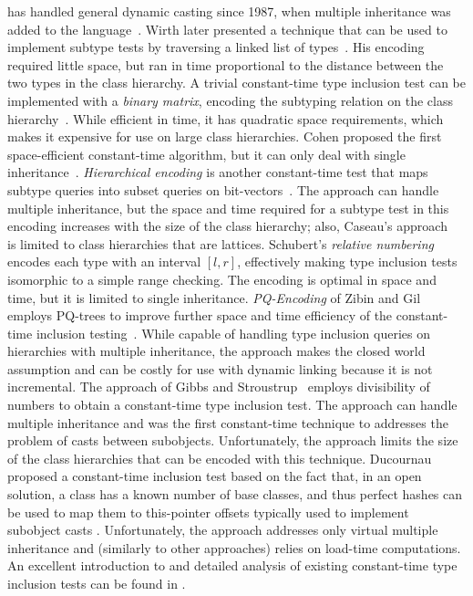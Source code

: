 \Cpp{} has handled general dynamic casting since 1987, when multiple inheritance 
was added to the language~\cite{Str87}. Wirth later presented a technique that 
can be used to implement subtype tests by traversing a linked list of 
types~\cite{Wirth88}. His encoding required little space, but ran in time 
proportional to the distance between the two types in the class hierarchy. 
A trivial constant-time type inclusion test can be implemented with a 
\emph{binary matrix}, encoding the subtyping relation on the class 
hierarchy~\cite{Vortex96}. While efficient in time, it has quadratic space 
requirements, which makes it expensive for use on large class hierarchies. Cohen 
proposed the first space-efficient constant-time algorithm, but it can
only deal with single inheritance~\cite{Cohen91}. \emph{Hierarchical encoding} 
is another constant-time test that maps subtype queries into subset queries on 
bit-vectors~\cite{Caseau93,Krall97nearoptimal}. The approach can handle multiple
inheritance, but the space and time required for a subtype test in this encoding 
increases with the size of the class hierarchy; also, Caseau's approach~\cite{Caseau93} is 
limited to class hierarchies that are lattices. Schubert's \emph{relative 
numbering}~\cite{Schubert83} encodes each type with an interval $[l,r]$, 
effectively making type inclusion tests isomorphic to a simple range checking. 
The encoding is optimal in space and time, but it is limited to single 
inheritance. \emph{PQ-Encoding} of Zibin and Gil employs PQ-trees to improve 
further space and time efficiency of the constant-time inclusion 
testing~\cite{PQEncoding}. While capable of handling type inclusion queries on 
hierarchies with multiple inheritance, the approach makes the closed world assumption and can be costly 
for use with dynamic linking because it is not incremental.
The approach of Gibbs and Stroustrup~\cite{FastDynCast} employs divisibility of 
numbers to obtain a constant-time type inclusion test. The approach can handle 
multiple inheritance and was the first constant-time technique to addresses the 
problem of casts between subobjects. Unfortunately, the approach limits the size 
of the class hierarchies that can be encoded with this technique. 
Ducournau proposed a constant-time inclusion test based on the fact that, in an 
open solution, a class has a known number of base classes, and thus perfect hashes 
can be used to map them to this-pointer offsets typically used to implement 
subobject casts \cite{Ducournau08}. Unfortunately, the approach addresses only 
virtual multiple inheritance and (similarly to other approaches) relies on 
load-time computations. An excellent introduction to and detailed 
analysis of existing constant-time type inclusion tests can be found in 
\cite{Vitek97,PQEncoding}.

